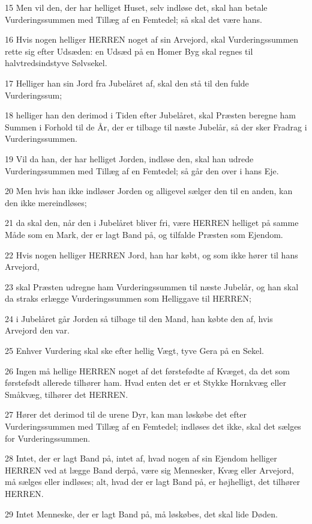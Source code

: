 \par 15 Men vil den, der har helliget Huset, selv indløse det, skal han betale Vurderingssummen med Tillæg af en Femtedel; så skal det være hans.
\par 16 Hvis nogen helliger HERREN noget af sin Arvejord, skal Vurderingssummen rette sig efter Udsæden: en Udsæd på en Homer Byg skal regnes til halvtredsindstyve Sølvsekel.
\par 17 Helliger han sin Jord fra Jubelåret af, skal den stå til den fulde Vurderingssum;
\par 18 helliger han den derimod i Tiden efter Jubelåret, skal Præsten beregne ham Summen i Forhold til de År, der er tilbage til næste Jubelår, så der sker Fradrag i Vurderingssummen.
\par 19 Vil da han, der har helliget Jorden, indløse den, skal han udrede Vurderingssummen med Tillæg af en Femtedel; så går den over i hans Eje.
\par 20 Men hvis han ikke indløser Jorden og alligevel sælger den til en anden, kan den ikke mereindløses;
\par 21 da skal den, når den i Jubelåret bliver fri, være HERREN helliget på samme Måde som en Mark, der er lagt Band på, og tilfalde Præsten som Ejendom.
\par 22 Hvis nogen helliger HERREN Jord, han har købt, og som ikke hører til hans Arvejord,
\par 23 skal Præsten udregne ham Vurderingssummen til næste Jubelår, og han skal da straks erlægge Vurderingssummen som Helliggave til HERREN;
\par 24 i Jubelåret går Jorden så tilbage til den Mand, han købte den af, hvis Arvejord den var.
\par 25 Enhver Vurdering skal ske efter hellig Vægt, tyve Gera på en Sekel.
\par 26 Ingen må hellige HERREN noget af det førstefødte af Kvæget, da det som førstefødt allerede tilhører ham. Hvad enten det er et Stykke Hornkvæg eller Småkvæg, tilhører det HERREN.
\par 27 Hører det derimod til de urene Dyr, kan man løskøbe det efter Vurderingssummen med Tillæg af en Femtedel; indløses det ikke, skal det sælges for Vurderingssummen.
\par 28 Intet, der er lagt Band på, intet af, hvad nogen af sin Ejendom helliger HERREN ved at lægge Band derpå, være sig Mennesker, Kvæg eller Arvejord, må sælges eller indløses; alt, hvad der er lagt Band på, er højhelligt, det tilhører HERREN.
\par 29 Intet Menneske, der er lagt Band på, må løskøbes, det skal lide Døden.

